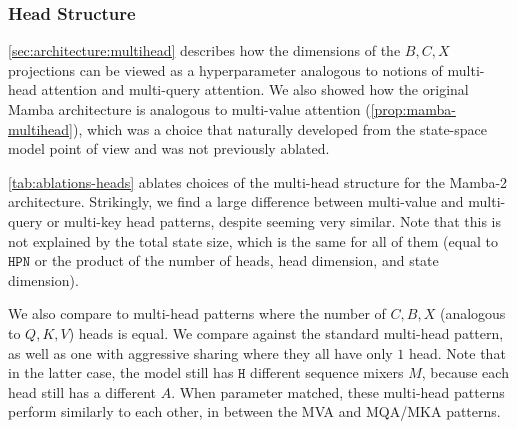 \documentclass{article}
\begin{document}
{\subsubsection{Head Structure}

\cref{sec:architecture:multihead} describes how the dimensions of the $B, C, X$ projections can be viewed as a hyperparameter analogous to notions of multi-head attention and multi-query attention.
We also showed how the original Mamba architecture is analogous to multi-value attention (\cref{prop:mamba-multihead}),
which was a choice that naturally developed from the state-space model point of view and was not previously ablated.

\cref{tab:ablations-heads} ablates choices of the multi-head structure for the Mamba-2 architecture.
Strikingly, we find a large difference between multi-value and multi-query or multi-key head patterns,
despite seeming very similar.
Note that this is not explained by the total state size, which is the same for all of them (equal to $\mathtt{HPN}$ or the product of the number of heads, head dimension, and state dimension).

We also compare to multi-head patterns where the number of $C, B, X$ (analogous to $Q, K, V$) heads is equal.
We compare against the standard multi-head pattern, as well as one with aggressive sharing where they all have only $1$ head.
Note that in the latter case, the model still has $\mathtt{H}$ different sequence mixers $M$, because each head still has a different $A$.
When parameter matched, these multi-head patterns perform similarly to each other, in between the MVA and MQA/MKA patterns.

}
\end{document}
